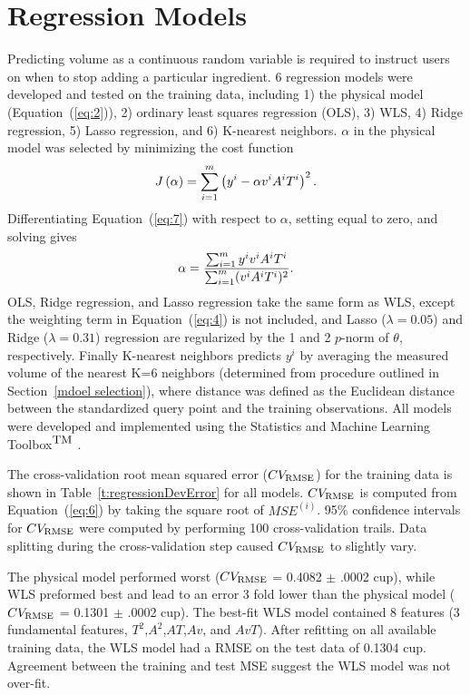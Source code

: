 \documentclass[twocolumn,10pt]{article}
\begin{document}
\section{Regression Models}
\label{regression}
Predicting volume as a continuous random variable is required to instruct users on when to stop adding a particular ingredient. 6 regression models were developed and tested on the training data, including 1) the physical model (Equation~(\ref{eq:2})), 2) ordinary least squares regression (OLS), 3) WLS, 4) Ridge regression, 5) Lasso regression, and 6) K-nearest neighbors. $\alpha$ in the physical model was selected by minimizing the cost function
\begin{equation} \label{eq:7}
J\left( \alpha \right) = \sum_{i=1}^{m} \left( y^{i} - \alpha v^{i}A^{i}T^{i} \right)^{2}\\.
\end{equation}
Differentiating Equation~(\ref{eq:7}) with respect to $\alpha$, setting equal to zero, and solving gives
\begin{equation} \label{eq:9}
\alpha = \frac{\sum_{i=1}^{m} y^{i} v^{i}A^{i}T^{i}}{\sum_{i=1}^{m} (v^{i}A^{i}T^{i})^{2}} \\.
\end{equation}
OLS, Ridge regression, and Lasso regression take the same form as WLS, except the weighting term in Equation~(\ref{eq:4}) is not included, and Lasso ($\lambda = 0.05$) and Ridge ($\lambda = 0.31$) regression are regularized by the 1 and 2 $p$-norm of $\theta$, respectively. Finally K-nearest neighbors predicts $y^{i}$ by averaging the measured volume of the nearest K=6 neighbors (determined from procedure outlined in Section~\ref{mdoel selection}), where distance was defined as the Euclidean distance between the standardized query point and the training observations. All models were developed and implemented using the Statistics and Machine Learning Toolbox$^{\hbox{\small TM}}$ \cite{Matlab}.

The cross-validation root mean squared error ($CV_{\hbox{\scriptsize RMSE}}$) for the training data is shown in Table~\ref{t:regressionDevError}  for all models. $CV_{\hbox{\scriptsize RMSE}}$ is computed from Equation~(\ref{eq:6}) by taking the square root of $MSE^{(i)}$. 95\% confidence intervals for $CV_{\hbox{\scriptsize RMSE}}$ were computed by performing 100 cross-validation trails. Data splitting during the cross-validation step caused $CV_{\hbox{\scriptsize RMSE}}$ to slightly vary. 

The physical model performed worst ($CV_{\hbox{\scriptsize RMSE}}$ = 0.4082 $\pm$ .0002 cup), while WLS preformed best and lead to an error 3 fold lower than the physical model ($CV_{\hbox{\scriptsize RMSE}}$ = 0.1301 $\pm$ .0002 cup). The best-fit WLS model contained 8 features (3 fundamental features, $T^{2}$,$A^{2}$,$AT$,$Av$, and $AvT$). After refitting on all available training data, the WLS model had a RMSE on the test data of 0.1304 cup. Agreement between the training and test MSE suggest the WLS model was not over-fit.
\end{document}
